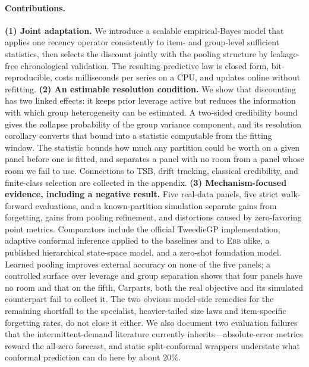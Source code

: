 \documentclass[twocolumn,10pt]{article}
\theoremstyle{definition}
\newcommand{\EBB}{\textsc{Ebb}}
\begin{document}
\paragraph{Contributions.}
\textbf{(1) Joint adaptation.} We introduce a scalable empirical-Bayes
model that applies one recency operator consistently to item- and
group-level sufficient statistics, then selects the discount jointly with
the pooling structure by leakage-free chronological validation. The
resulting predictive law is closed form, bit-reproducible, costs
milliseconds per series on a CPU, and updates online without refitting.
\textbf{(2) An estimable resolution condition.} We show that discounting
has two linked effects: it keeps prior leverage active but reduces the
information with which group heterogeneity can be estimated. A two-sided
credibility bound gives the collapse probability of the group variance
component, and its resolution corollary converts that bound into a
statistic computable from the fitting window. The statistic bounds how
much any partition could be worth on a given panel before one is fitted,
and separates a panel with no room from a panel whose room we fail to use.
Connections to TSB, drift tracking, classical credibility, and
finite-class selection are collected in the appendix.
\textbf{(3) Mechanism-focused evidence, including a negative result.}
Five real-data panels, five strict walk-forward evaluations, and a
known-partition simulation separate gains from forgetting, gains from
pooling refinement, and distortions caused by zero-favoring point metrics.
Comparators include the official TweedieGP implementation, adaptive
conformal inference applied to the baselines and to \EBB{} alike, a
published hierarchical state-space model, and a zero-shot foundation
model. %
Learned pooling improves external accuracy on
none of the five panels; a controlled surface over leverage and group
separation shows that four panels have no room and that on the fifth,
Carparts, both the real objective and its simulated counterpart fail to
collect it. The two obvious model-side remedies for the remaining shortfall to
the specialist, heavier-tailed size laws and item-specific forgetting
rates, do not close it either. We also document two evaluation failures that the
intermittent-demand literature currently inherits---absolute-error metrics
reward the all-zero forecast, and static split-conformal wrappers
understate what conformal prediction can do here by about $20\%$.
\end{document}
